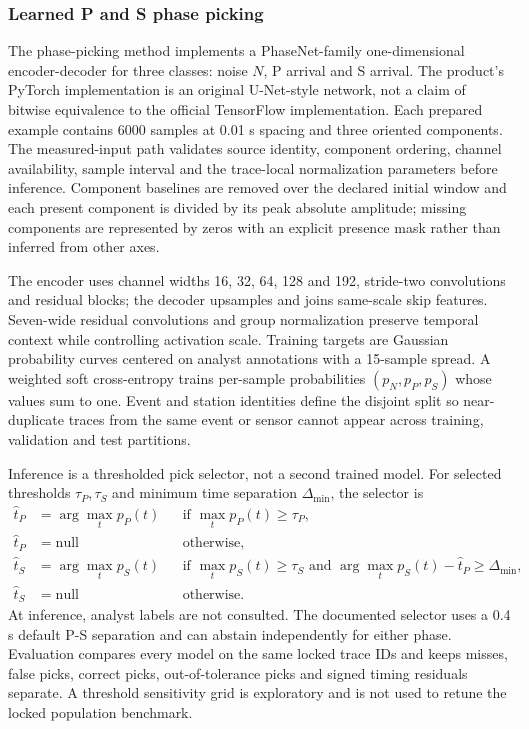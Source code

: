 \subsubsection{Learned P and S phase picking}\label{method-phase-picking}

The phase-picking method implements a PhaseNet-family one-dimensional encoder-decoder for
three classes: noise \(N\), P arrival and S arrival. The product's
PyTorch implementation is an original U-Net-style network, not a claim
of bitwise equivalence to the official TensorFlow implementation.
Each prepared example contains 6000 samples at 0.01 s spacing and three
oriented components. The measured-input path validates source identity,
component ordering, channel availability, sample interval and the
trace-local normalization parameters before inference. Component
baselines are removed over the declared initial window and each present
component is divided by its peak absolute amplitude; missing components
are represented by zeros with an explicit presence mask rather than
inferred from other axes.

The encoder uses channel widths 16, 32, 64, 128 and 192, stride-two
convolutions and residual blocks; the decoder upsamples and joins
same-scale skip features. Seven-wide residual convolutions and
group normalization preserve temporal context while controlling
activation scale. Training targets are Gaussian probability curves
centered on analyst annotations with a 15-sample spread. A weighted
soft cross-entropy trains per-sample probabilities \((p_N,p_P,p_S)\)
whose values sum to one. Event and station identities define the
disjoint split so near-duplicate traces from the same event or sensor
cannot appear across training, validation and test partitions.

Inference is a thresholded pick selector, not a second trained model.
For selected thresholds \(\tau_P,\tau_S\) and minimum time separation
\(\Delta_{\min}\), the selector is
\begin{equation}\label{eq:phase-picker}
 \begin{aligned}
 \widehat t_P&=\arg\max_t p_P(t)
 &&\text{if }\max_t p_P(t)\geq\tau_P,\\
 \widehat t_P&=\mathrm{null}
 &&\text{otherwise},\\
 \widehat t_S&=\arg\max_t p_S(t)
 &&\text{if }\max_t p_S(t)\geq\tau_S
 \text{ and }\arg\max_t p_S(t)-\widehat t_P\geq\Delta_{\min},\\
 \widehat t_S&=\mathrm{null}&&\text{otherwise}.
 \end{aligned}
\end{equation}
At inference, analyst labels are not consulted. The documented selector
uses a 0.4 s default P-S separation and can abstain independently for
either phase. Evaluation compares every model on the same locked trace
IDs and keeps misses, false picks, correct picks, out-of-tolerance picks
and signed timing residuals separate. A threshold sensitivity grid is
exploratory and is not used to retune the locked population benchmark.

